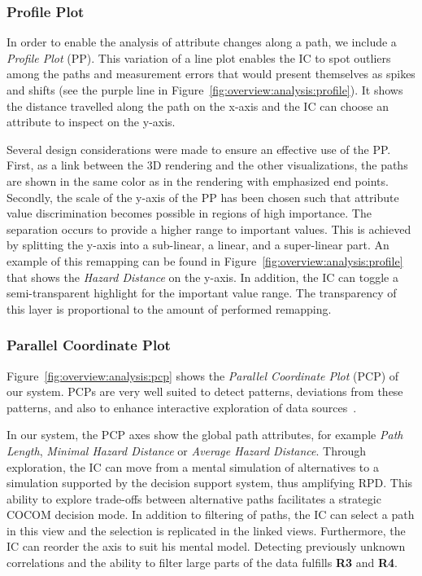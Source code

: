 \documentclass{egpubl}
\begin{document}
\subsubsection{Profile Plot} \label{sec:overview:analysis:profile}
In order to enable the analysis of attribute changes along a path, we include a \emph{Profile Plot} (PP). This variation of a line plot enables the IC to spot outliers among the paths and measurement errors that would present themselves as spikes and shifts (see the purple line in Figure~\ref{fig:overview:analysis:profile}). It shows the distance travelled along the path on the x-axis and the IC can choose an attribute to inspect on the y-axis.

Several design considerations were made to ensure an effective use of the PP. First, as a link between the 3D rendering and the other visualizations, the paths are shown in the same color as in the rendering with emphasized end points. Secondly, the scale of the y-axis of the PP has been chosen such that attribute value discrimination becomes possible in regions of high importance. The separation occurs to provide a higher range to important values. This is achieved by splitting the y-axis into a sub-linear, a linear, and a super-linear part. An example of this remapping can be found in Figure~\ref{fig:overview:analysis:profile} that shows the \emph{Hazard Distance} on the y-axis. In addition, the IC can toggle a semi-transparent highlight for the important value range. The transparency of this layer is proportional to the amount of performed remapping.

\subsubsection{Parallel Coordinate Plot} \label{sec:overview:analysis:pcp}
Figure~\ref{fig:overview:analysis:pcp} shows the \emph{Parallel Coordinate Plot} (PCP) of our system. PCPs are very well suited to detect patterns, deviations from these patterns, and also to enhance interactive exploration of data sources~\cite{Tory05aparallel}.

In our system, the PCP axes show the global path attributes, for example \emph{Path Length}, \emph{Minimal Hazard Distance} or \emph{Average Hazard Distance}. Through exploration, the IC can move from a mental simulation of alternatives to a simulation supported by the decision support system, thus amplifying RPD. This ability to explore trade-offs between alternative paths facilitates a strategic COCOM decision mode. In addition to filtering of paths, the IC can select a path in this view and the selection is replicated in the linked views. Furthermore, the IC can reorder the axis to suit his mental model. Detecting previously unknown correlations and the ability to filter large parts of the data fulfills {\bfseries R3} and {\bfseries R4}.
\end{document}
